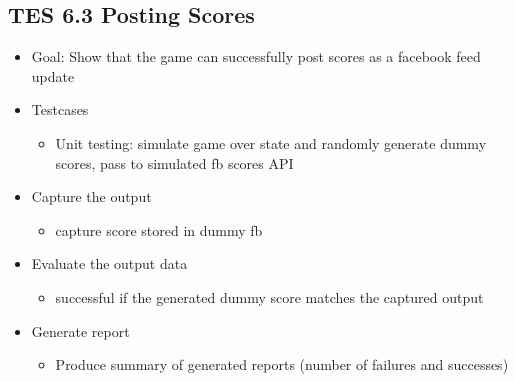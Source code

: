 \subsection{TES 6.3 Posting Scores}
\begin{itemize}
\item Goal: Show that the game can successfully post scores as a facebook feed update

\item Testcases
\begin{itemize}
\item Unit testing: simulate game over state and randomly generate dummy scores, pass to simulated fb scores API
\end{itemize}

\item Capture the output
\begin{itemize}
\item capture score stored in dummy fb
\end{itemize}

\item Evaluate the output data
\begin{itemize}
\item successful if the generated dummy score matches the captured output
\end{itemize}

\item Generate report
\begin{itemize}
\item Produce summary of generated reports (number of failures and successes)
\end{itemize}
\end{itemize}

